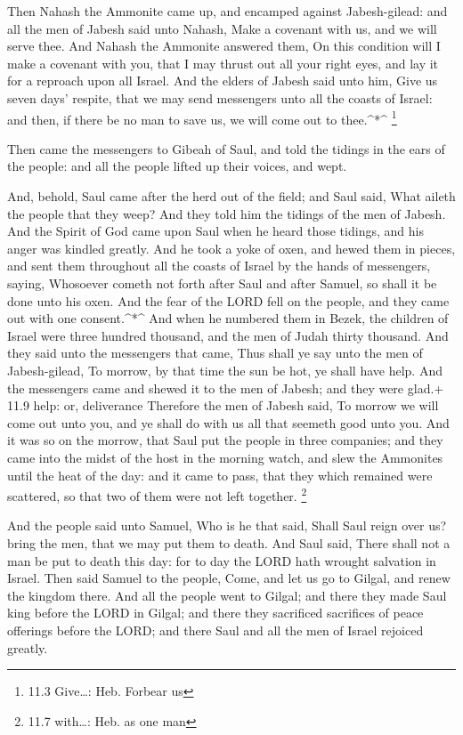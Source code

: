 Then Nahash the Ammonite came up, and encamped against
Jabesh-gilead: and all the men of Jabesh said unto Nahash, Make a
covenant with us, and we will serve thee.  And Nahash the
Ammonite answered them, On this condition will I make a covenant with
you, that I may thrust out all your right eyes, and lay it for a
reproach upon all Israel.  And the elders of Jabesh said
unto him, Give us seven days' respite, that we may send messengers unto
all the coasts of Israel: and then, if there be no man to save us, we
will come out to thee.\^{}*\^{} \footnote{11.3 Give\ldots: Heb. Forbear
  us}

 Then came the messengers to Gibeah of Saul, and told the
tidings in the ears of the people: and all the people lifted up their
voices, and wept.

 And, behold, Saul came after the herd out of the field; and
Saul said, What aileth the people that they weep? And they told him the
tidings of the men of Jabesh.  And the Spirit of God came
upon Saul when he heard those tidings, and his anger was kindled
greatly.  And he took a yoke of oxen, and hewed them in
pieces, and sent them throughout all the coasts of Israel by the hands
of messengers, saying, Whosoever cometh not forth after Saul and after
Samuel, so shall it be done unto his oxen. And the fear of the LORD fell
on the people, and they came out with one consent.\^{}*\^{} 
And when he numbered them in Bezek, the children of Israel were three
hundred thousand, and the men of Judah thirty thousand.  And
they said unto the messengers that came, Thus shall ye say unto the men
of Jabesh-gilead, To morrow, by that time the sun be hot, ye shall have
help. And the messengers came and shewed it to the men of Jabesh; and
they were glad.+ 11.9 help: or, deliverance  Therefore the
men of Jabesh said, To morrow we will come out unto you, and ye shall do
with us all that seemeth good unto you.  And it was so on
the morrow, that Saul put the people in three companies; and they came
into the midst of the host in the morning watch, and slew the Ammonites
until the heat of the day: and it came to pass, that they which remained
were scattered, so that two of them were not left together. \footnote{11.7
  with\ldots: Heb. as one man}

 And the people said unto Samuel, Who is he that said,
Shall Saul reign over us? bring the men, that we may put them to death.
 And Saul said, There shall not a man be put to death this
day: for to day the LORD hath wrought salvation in Israel. 
Then said Samuel to the people, Come, and let us go to Gilgal, and renew
the kingdom there.  And all the people went to Gilgal; and
there they made Saul king before the LORD in Gilgal; and there they
sacrificed sacrifices of peace offerings before the LORD; and there Saul
and all the men of Israel rejoiced greatly.


